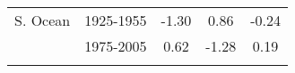 \documentclass[draft,grl]{agutexSI}
\begin{document}
\begin{table}
\begin{center}
\begin{tabular}{*{5}{c}}
    \\
    S. Ocean         &   1925-1955       & -1.30                                                &       0.86       &  -0.24       \\ 
                                    &    1975-2005      &  0.62                                                &      -1.28       &   0.19    \\
    \\
     \end{tabular}\par
     \label{LCCtable}
\end{center}
\end{table}
\end{document}
